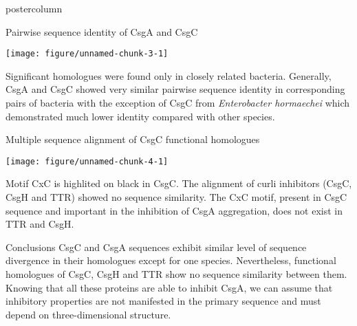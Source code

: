 \documentclass[final]{beamer}\usepackage[]{graphicx}\usepackage[]{color}
\makeatletter
\def\maxwidth{ %
  \ifdim\Gin@nat@width>\linewidth
    \linewidth
  \else
    \Gin@nat@width
  \fi
}
\def\maxwidth{ %
  \ifdim\Gin@nat@width>\linewidth
    \linewidth
  \else
    \Gin@nat@width
  \fi
}
\makeatother
\begin{document}
\begin{frame}
\begin{columns}
\begin{column}{.47\textwidth}
\begin{beamercolorbox}[center,wd=\textwidth]{postercolumn}
\begin{minipage}[T]{.99\textwidth}
{\begin{block}{Pairwise sequence identity of CsgA and CsgC}

\texttt{[image: figure/unnamed-chunk-3-1]} 

\justify Significant homologues were found only in closely related bacteria. Generally, CsgA and CsgC showed very similar pairwise sequence identity in corresponding pairs of bacteria with the exception of CsgC from \textit{Enterobacter hormaechei} which demonstrated much lower identity compared with other species.
\end{block}
\vfill


\begin{block}{Multiple sequence alignment of CsgC functional homologues }

\texttt{[image: figure/unnamed-chunk-4-1]} 

\justify Motif CxC is highlited on black in CsgC. The alignment of curli inhibitors (CsgC, CsgH and TTR) showed no sequence similarity. The CxC motif, present in CsgC sequence and important in the inhibition of CsgA aggregation, does not exist in TTR and CsgH.
\end{block}


\begin{block}{Conclusions}
\justify CsgC and CsgA sequences exhibit similar level of sequence divergence in their homologues except for one species. Nevertheless, functional homologues of CsgC, CsgH and TTR show no sequence similarity between them. Knowing that all these proteins are able to inhibit CsgA, we can assume that inhibitory properties are not manifested in the primary sequence and must depend on three-dimensional structure.
\end{block}

}
\end{minipage}
\end{beamercolorbox}
\end{column}
\end{columns}
\end{frame}
\end{document}
